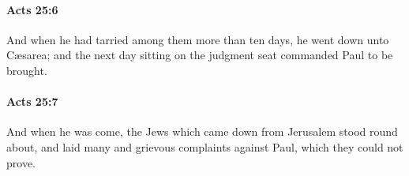 		\paragraph{Acts 25:6} %
			\label{ACTS-25-6}

			And when he had tarried among them more than ten days, he went down unto Cæsarea; and the next day sitting on the judgment seat commanded Paul to be brought.

			\begin{framed}
			\scriptsize
				\begin{compactdesc}
					\item[SBLG] 
				\end{compactdesc}
			\end{framed}

		\paragraph{Acts 25:7} %
			\label{ACTS-25-7}

			And when he was come, the Jews which came down from Jerusalem stood round about, and laid many and grievous complaints against Paul, which they could not prove.

